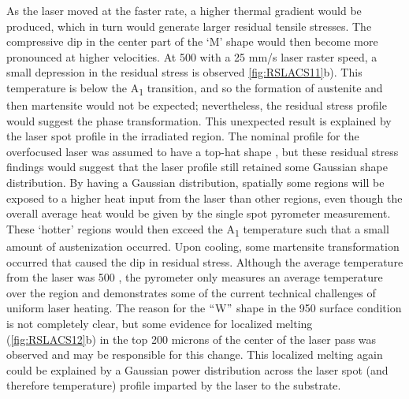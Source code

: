 		
		As the laser moved at the faster rate, a higher thermal gradient would be produced, which in turn would generate larger residual tensile stresses. The compressive dip in the center part of the ‘M’ shape would then become more pronounced at higher velocities. At 500 \celsius{} with a 25 mm/s laser raster speed, a small depression in the residual stress is observed \ref{fig:RSLACS11}b). This temperature is below the A\textsubscript{1 }transition, and so the formation of austenite and then martensite would not be expected; nevertheless, the residual stress profile would suggest the phase transformation. This unexpected result is explained by the laser spot profile in the irradiated region. The nominal profile for the overfocused laser was assumed to have a top-hat shape \cite{RN828}, but these residual stress findings would suggest that the laser profile still retained some Gaussian shape distribution. By having a Gaussian distribution, spatially some regions will be exposed to a higher heat input from the laser than other regions, even though the overall average heat would be given by the single spot pyrometer measurement.  These ‘hotter’ regions would then exceed the A\textsubscript{1} temperature such that a small amount of austenization occurred. Upon cooling, some martensite transformation occurred that caused the dip in residual stress. Although the average temperature from the laser was 500 \celsius{}, the pyrometer only measures an average temperature over the region and demonstrates some of the current technical challenges of uniform laser heating. The reason for the $``$W$"$  shape in the 950 \celsius{} surface condition is not completely clear, but some evidence for localized melting (\ref{fig:RSLACS12}b) in the top 200 microns of the center of the laser pass was observed and may be responsible for this change. This localized melting again could be explained by a Gaussian power distribution across the laser spot (and therefore temperature) profile imparted by the laser to the substrate.
		
		
		
